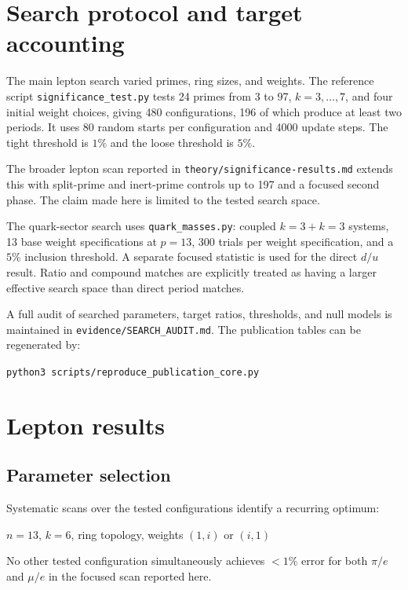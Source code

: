 \documentclass[11pt,a4paper]{article}
\begin{document}
\section{Search protocol and target accounting}

The main lepton search varied primes, ring sizes, and weights. The reference script \texttt{significance\_test.py} tests 24 primes from 3 to 97, $k=3,\ldots,7$, and four initial weight choices, giving 480 configurations, 196 of which produce at least two periods. It uses 80 random starts per configuration and 4000 update steps. The tight threshold is $1\%$ and the loose threshold is $5\%$.

The broader lepton scan reported in \texttt{theory/significance-results.md} extends this with split-prime and inert-prime controls up to 197 and a focused second phase. The claim made here is limited to the tested search space.

The quark-sector search uses \texttt{quark\_masses.py}: coupled $k=3+k=3$ systems, 13 base weight specifications at $p=13$, 300 trials per weight specification, and a $5\%$ inclusion threshold. A separate focused statistic is used for the direct $d/u$ result. Ratio and compound matches are explicitly treated as having a larger effective search space than direct period matches.

A full audit of searched parameters, target ratios, thresholds, and null models is maintained in \texttt{evidence/SEARCH\_AUDIT.md}. The publication tables can be regenerated by:

\begin{center}
\texttt{python3 scripts/reproduce\_publication\_core.py}
\end{center}

\section{Lepton results}

\subsection{Parameter selection}

Systematic scans over the tested configurations identify a recurring optimum:
\begin{center}
$n=13$, $k=6$, ring topology, weights $(1,i)$ or $(i,1)$
\end{center}
No other tested configuration simultaneously achieves $<1\%$ error for both $\pi/e$ and $\mu/e$ in the focused scan reported here.
\end{document}
